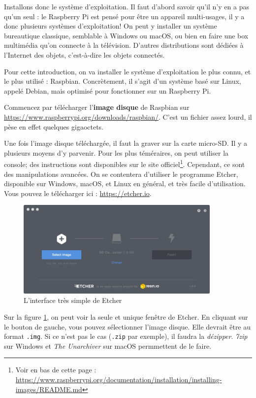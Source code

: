 Installons donc le système d'exploitation. Il faut d'abord savoir qu'il n'y en a pas qu'un seul : le Raspberry Pi est pensé pour être un appareil multi-usages, il y a donc plusieurs systèmes d'exploitation! On peut y installer un système bureautique classique, semblable à Windows ou macOS, ou bien en faire une box multimédia qu'on connecte à la télévision. D'autres distributions sont dédiées à l'Internet des objets, c'est-à-dire les objets connectés.

Pour cette introduction, on va installer le système d'exploitation le plus connu, et le plus utilisé : Raspbian. Concrètement, il s'agit d'un système basé sur Linux, appelé Debian, mais optimisé pour fonctionner sur un Raspberry Pi.

Commencez par télécharger l'\textbf{image disque} de Raspbian sur \url{https://www.raspberrypi.org/downloads/raspbian/}. C'est un fichier assez lourd, il pèse en effet quelques gigaoctets.

Une fois l'image disque téléchargée, il faut la graver sur la carte micro-SD. Il y a plusieurs moyens d'y parvenir. Pour les plus téméraires, on peut utiliser la console; des instructions sont disponibles sur le site officiel\footnote{Voir en bas de cette page : \url{https://www.raspberrypi.org/documentation/installation/installing-images/README.md}}. Cependant, ce sont des manipulations avancées. On se contentera d'utiliser le programme Etcher, disponible sur Windows, macOS, et Linux en général, et très facile d'utilisation. Vous pouvez le télécharger ici : \url{https://etcher.io}.

\begin{figure}[h!]
\begin{center}
\includegraphics[width=10cm]{img/etcher.jpg}
\end{center}
\caption{L'interface très simple de Etcher}
\label{etcher}
\end{figure}

Sur la figure \ref{etcher}, on peut voir la seule et unique fenêtre de Etcher. En cliquant sur le bouton de gauche, vous pouvez sélectionner l'image disque. Elle devrait être au format \texttt{.img}. Si ce n'est pas le cas (\texttt{.zip} par exemple), il faudra la \textit{dézipper}. \textit{7zip} sur Windows et \textit{The Unarchiver} sur macOS permmettent de le faire.

